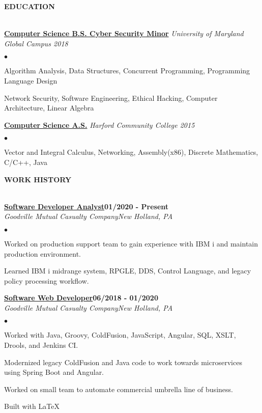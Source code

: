 \documentclass{article}
\newcommand{\lineunder}{
	\vspace*{-4pt}\\ 
	\hspace*{-18pt}\hrulefill \\
}
\newcommand{\header}[1]{
	{\hspace*{-15pt}\vspace*{6pt}\textsc{#1}}\vspace*{-6pt}\lineunder
}
\newcommand{\employer}[4]{
	{\underline{\textbf{#1}}{\hfill\textbf{#2}}\\ 
	\vspace*{2pt}\textit{#3}\hfill \textit{#4}\\}
}
\newcommand{\education}[2]{
	\textbf{\underline{{#1}}} \textit{#2}\vspace*{3pt}
}
\newenvironment{resumecontent}{
	\begin{list}
		{\small$\bullet$}{\topsep 0pt \itemsep -2pt}}{\vspace*{4pt}
	\end{list}
}
\newcommand{\resumeheader}[1]{
	\vspace*{10pt}
	\header{\textbf{#1}}
    \vspace*{5pt}
}
\begin{document}
	\resumeheader{EDUCATION}
		\education {Computer Science B.S. Cyber Security Minor}{University of Maryland Global Campus 2018}
            \begin{resumecontent}
                \item Algorithm Analysis, Data Structures, Concurrent Programming, Programming Language Design
                \item Network Security, Software Engineering, Ethical Hacking, Computer Architecture, Linear Algebra
            \end{resumecontent}
            \vspace*{3pt}
		\education {Computer Science A.S.}{Harford Community College 2015}
            \begin{resumecontent}
                \item Vector and Integral Calculus, Networking, Assembly(x86), Discrete Mathematics, C/C++, Java
            \end{resumecontent}

	\resumeheader{WORK HISTORY}
        \employer{Software Developer Analyst}{01/2020 - Present}{Goodville Mutual Casualty Company}{New Holland, PA}
            \vspace*{2pt}
			\begin{resumecontent}
				\item Worked on production support team to gain experience with IBM i and maintain production environment.
                \item Learned IBM i midrange system, RPGLE, DDS, Control Language, and legacy policy processing workflow.
			\end{resumecontent}
            \vspace*{4pt}
		\employer{Software Web Developer}{06/2018 - 01/2020}{Goodville Mutual Casualty Company}{New Holland, PA}
            \vspace*{2pt}
			\begin{resumecontent}
				\item Worked with Java, Groovy, ColdFusion, JavaScript, Angular, SQL, XSLT, Drools, and Jenkins CI.
				\item Modernized legacy ColdFusion and Java code to work towards microservices using Spring Boot and Angular.
				\item Worked on small team to automate commercial umbrella line of business.
			\end{resumecontent}

	\begin{center}
		\small 
		\vspace*{55pt} Built with \LaTeX
	\end{center}
\end{document}
